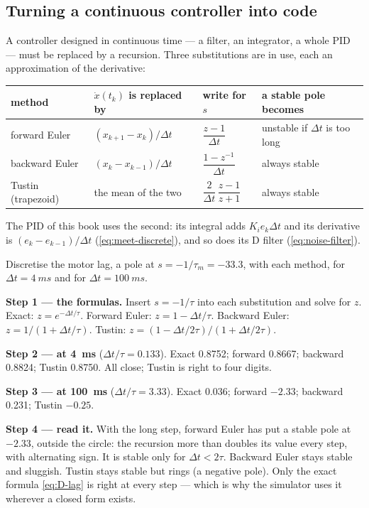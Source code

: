 \subsection{Turning a continuous controller into code}
A controller designed in continuous time — a filter, an integrator, a whole PID — must be replaced by a recursion. Three substitutions are in use, each an approximation of the derivative:
\begin{center}\small
\renewcommand{\arraystretch}{1.5}
\begin{tabular}{@{}llll@{}}
\toprule
method & $\dot x(t_k)$ is replaced by & write for $s$ & a stable pole becomes\\
\midrule
forward Euler & $(x_{k+1} - x_k)/\Delta t$ & $\dfrac{z - 1}{\Delta t}$ & unstable if $\Delta t$ is too long\\
backward Euler & $(x_k - x_{k-1})/\Delta t$ & $\dfrac{1 - z^{-1}}{\Delta t}$ & always stable\\
Tustin\index{Tustin transform} (trapezoid) & the mean of the two & $\dfrac{2}{\Delta t}\,\dfrac{z - 1}{z + 1}$ & always stable\\
\bottomrule
\end{tabular}
\end{center}
The PID of this book uses the second: its integral adds $K_ie_k\Delta t$ and its derivative is $(e_k - e_{k-1})/\Delta t$ (\cref{eq:meet-discrete}), and so does its D filter (\cref{eq:noise-filter}).

\begin{example}
\label{ex:D-methods}
Discretise the motor lag, a pole at $s = -1/\tau_m = -33.3$, with each method, for $\Delta t = \SI{4}{ms}$ and for $\Delta t = \SI{100}{ms}$.

\textbf{Step 1 — the formulas.} Insert $s = -1/\tau$ into each substitution and solve for $z$. Exact: $z = e^{-\Delta t/\tau}$. Forward Euler: $z = 1 - \Delta t/\tau$. Backward Euler: $z = 1/(1 + \Delta t/\tau)$. Tustin: $z = (1 - \Delta t/2\tau)/(1 + \Delta t/2\tau)$.

\textbf{Step 2 — at \SI{4}{ms}} ($\Delta t/\tau = 0.133$). Exact 0.8752; forward 0.8667; backward 0.8824; Tustin 0.8750. All close; Tustin is right to four digits.

\textbf{Step 3 — at \SI{100}{ms}} ($\Delta t/\tau = 3.33$). Exact 0.036; forward $-2.33$; backward 0.231; Tustin $-0.25$.

\textbf{Step 4 — read it.} With the long step, forward Euler has put a stable pole at $-2.33$, outside the circle: the recursion more than doubles its value every step, with alternating sign. It is stable only for $\Delta t < 2\tau$. Backward Euler stays stable and sluggish. Tustin stays stable but rings (a negative pole). Only the exact formula \eqref{eq:D-lag} is right at every step — which is why the simulator uses it wherever a closed form exists.
\end{example}


